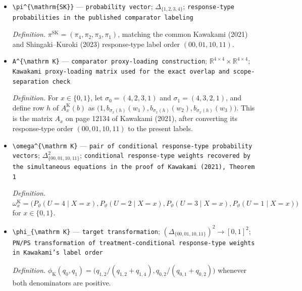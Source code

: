 \documentclass{article}
\begin{document}
\begin{itemize}
  \item \texttt{\textbackslash{}\allowbreak{}pi\textasciicircum{}\{\textbackslash{}\allowbreak{}mathrm\{SK\}\allowbreak{}\}\allowbreak{}} --- \texttt{probability vector}; \(\Delta_{\{1,2,3,4\}}\); \texttt{response-\allowbreak{}type probabilities in the published comparator labeling}
  \par\smallskip\noindent\emph{Definition.} \(\pi^{\mathrm{SK}}=(\pi_4,\pi_2,\pi_3,\pi_1)\), matching the common Kawakami (2021) and Shingaki--Kuroki (2023) response-type label order \((00,01,10,11)\).
  \item \texttt{A\textasciicircum{}\{\textbackslash{}\allowbreak{}mathrm K\}\allowbreak{}} --- \texttt{comparator proxy-\allowbreak{}loading construction}; \(\mathbb R^{4\times4}\times\mathbb R^{4\times4}\); \texttt{Kawakami proxy-\allowbreak{}loading matrix used for the exact overlap and scope-\allowbreak{}separation check}
  \par\smallskip\noindent\emph{Definition.} For \(x\in\{0,1\}\), let \(\sigma_0=(4,2,3,1)\) and \(\sigma_1=(4,3,2,1)\), and define row \(h\) of \(A_x^{\mathrm K}(b)\) as \(\bigl(1,b_{\sigma_x(h)}(w_1),b_{\sigma_x(h)}(w_2),b_{\sigma_x(h)}(w_3)\bigr)\). This is the matrix \(A_x\) on page 12134 of Kawakami (2021), after converting its response-type order \((00,01,10,11)\) to the present labels.
  \item \texttt{\textbackslash{}\allowbreak{}omega\textasciicircum{}\{\textbackslash{}\allowbreak{}mathrm K\}\allowbreak{}} --- \texttt{pair of conditional response-\allowbreak{}type probability vectors}; \(\Delta_{\{00,01,10,11\}}^2\); \texttt{conditional response-\allowbreak{}type weights recovered by the simultaneous equations in the proof of Kawakami (2021),\allowbreak{} Theorem 1}
  \par\smallskip\noindent\emph{Definition.} \(\omega_x^{\mathrm K}=\bigl(P_{\vartheta}(U=4\mid X=x),P_{\vartheta}(U=2\mid X=x),P_{\vartheta}(U=3\mid X=x),P_{\vartheta}(U=1\mid X=x)\bigr)\) for \(x\in\{0,1\}\).
  \item \texttt{\textbackslash{}\allowbreak{}phi\_\allowbreak{}\{\textbackslash{}\allowbreak{}mathrm K\}\allowbreak{}} --- \texttt{target transformation}; \((\Delta_{\{00,01,10,11\}})^2\to[0,1]^2\); \texttt{PN/\allowbreak{}PS transformation of treatment-\allowbreak{}conditional response-\allowbreak{}type weights in Kawakami's label order}
  \par\smallskip\noindent\emph{Definition.} \(\phi_{\mathrm K}(q_0,q_1)=\bigl(q_{1,2}/(q_{1,2}+q_{1,4}),q_{0,2}/(q_{0,1}+q_{0,2})\bigr)\) whenever both denominators are positive.

\end{itemize}
\end{document}
